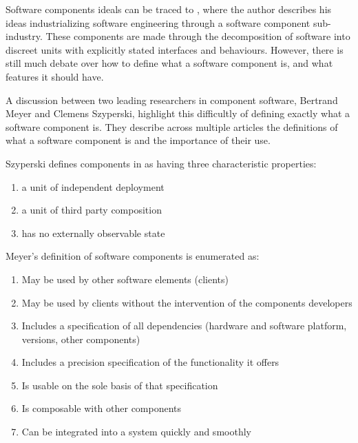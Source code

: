 Software components ideals can be traced to \cite{McIlroy1969}, where the author describes his ideas industrializing software engineering through a software component sub-industry. 
These components are made through the decomposition of software into discreet units with explicitly stated interfaces and behaviours.
However, there is still much debate over how to define what a software component is, and what features it should have.

A discussion between two leading researchers in component software, Bertrand Meyer and Clemens Szyperski, highlight this difficultly of defining exactly what a software component is. 
They describe across multiple articles \cite{Meyer1999,Szyperski2000a, Szyperski2000, Meyer2000,} the definitions of what a software component is and the importance of their use.

Szyperski defines components in \cite{Szyperski2002} as having three characteristic properties:
\begin{enumerate}
  \item a unit of independent deployment
  \item a unit of third party composition
  \item has no externally observable state
\end{enumerate}

Meyer's definition of software components is enumerated as:
\begin{enumerate}
  \item May be used by other software elements (clients)
  \item May be used by clients without the intervention of the components
  developers
  \item Includes a specification of all dependencies (hardware and software
  platform, versions, other components)
  \item Includes a precision specification of the functionality it offers
  \item Is usable on the sole basis of that specification
  \item Is composable with other components
  \item Can be integrated into a system quickly and smoothly
\end{enumerate}

